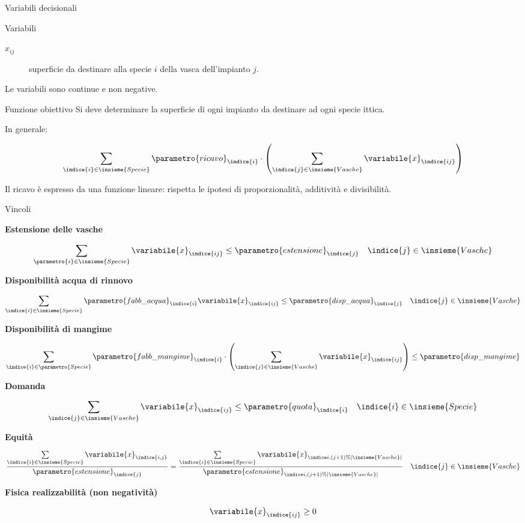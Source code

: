 \documentclass{beamer}
\begin{document}
\begin{frame}{Variabili decisionali}
\begin{block}{Variabili}
	\begin{description}
		\item[$x_{ij}$] superficie da destinare alla specie $i$ della vasca dell'impianto $j$.
	\end{description}
\end{block}

  Le variabili sono continue e non negative.

\end{frame}

\begin{frame}{Funzione obiettivo}
Si deve determinare la superficie di ogni impianto da destinare ad ogni specie ittica.

In generale:

$$  \sum_{\indice{i} \in \insieme{Specie}} \parametro{ricavo}_{\indice{i}}\cdot
         \left(\sum_{\indice{j} \in \insieme{Vasche}} \variabile{x}_{\indice{ij}}\right)$$

Il ricavo \`e espresso da una funzione lineare: rispetta le ipotesi di proporzionalit\`a, additivit\`a e divisibilit\`a.
\end{frame}

\begin{frame}[allowframebreaks]{Vincoli}

\textbf{Estensione delle vasche}

$$ \sum_{\parametro{i} \in \insieme{Specie}} \variabile{x}_{\indice{ij}} \leq \parametro{estensione}_{\indice{j}} \quad \indice{j} \in \insieme{Vasche}$$

\textbf{Disponibilit\`a acqua di rinnovo}

$$ \sum_{\indice{i} \in \insieme{Specie}} \parametro{fabb\_acqua}_{\indice{i}} \variabile{x}_{\indice{ij}} \leq \parametro{disp\_acqua}_{\indice{j}} \quad \indice{j} \in \insieme{Vasche}$$

\framebreak

\textbf{Disponibilit\`a di mangime}

$$ \sum_{\indice{i} \in \parametro{Specie}} \parametro{fabb\_mangime}_{\indice{i}} \cdot
      \left( \sum_{\indice{j} \in \insieme{Vasche}} \variabile{x}_{\indice{ij}} \right) \leq \parametro{disp\_mangime}$$

\textbf{Domanda}

$$ \sum_{\indice{j} \in \insieme{Vasche}} \variabile{x}_{\indice{ij}} \leq \parametro{quota}_{\indice{i}} \quad \indice{i} \in \insieme{Specie}$$

\textbf{Equit\`a}

$$ \frac{\sum\limits_{\indice{i} \in \insieme{Specie}} \variabile{x}_{\indice{i,j}}}{\parametro{estensione}_{\indice{j}}} =
   \frac{\sum\limits_{\indice{i} \in \insieme{Specie}} \variabile{x}_{\indice{i,(j+1)\%|\insieme{Vasche}|}}}{\parametro{estensione}_{\indice{i,(j+1)\%|\insieme{Vasche}|}}}
   \quad \indice{j} \in \insieme{Vasche}$$

\textbf{Fisica realizzabilit\`a (non negativit\`a)}

$$ \variabile{x}_{\indice{ij}} \geq 0 $$
\end{frame}
\end{document}
